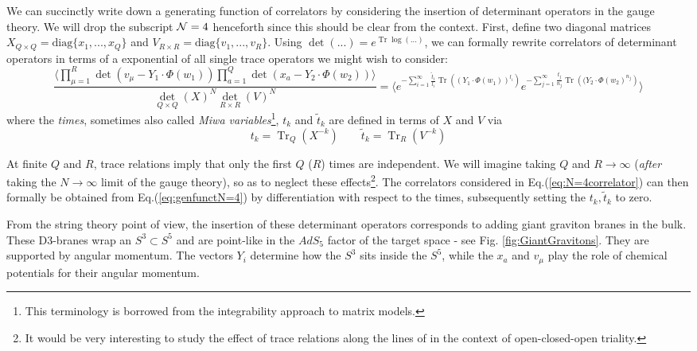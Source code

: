 \documentclass[english]{article}
\DeclareMathOperator{\Tr}{Tr}
\renewcommand{\>}{\rangle}
\newcommand{\<}{\langle}
\renewcommand{\(}{\left(}
\renewcommand{\)}{\right)}
\begin{document}
We can succinctly write down a generating function of correlators by considering the insertion of determinant operators in the gauge theory. We will drop the subscript ${\cal N}=4$ henceforth since this should be clear from the context. First, define two diagonal matrices $X_{Q \times Q} = \text{diag}\{x_{1},...,x_{Q}\}$ and $V_{R\times R} = \text{diag}\{v_{1},...,v_{R}\}$. Using $\det(...) = e^{\Tr \log(...)}$, we can formally rewrite correlators of determinant operators in terms of a exponential of all single trace operators we might wish to consider:
\begin{equation}
    \frac{ \langle \prod_{\mu=1}^{R} \det \left( v_{\mu}-Y_1 \cdot \Phi(w_{1}) \right) \prod_{a=1}^{Q} \det\left(x_{a}-Y_2 \cdot \Phi(w_{2}) \right) \rangle}{\det_{Q \times Q}(X)^{N} \det_{R \times R}(V)^{N}} =  \langle e^{-\sum_{i=1}^{\infty} \frac{\tilde{t}_{i}}{l_{i}} \Tr \left( (Y_1 \cdot \Phi(w_{1}))^{l_{i}} \right)}  e^{-\sum_{j=1}^{\infty} \frac{{t}_{j}}{n_{j}}\Tr \left( (Y_2 \cdot \Phi(w_{2})^{n_{j}} \right)} \rangle \label{eq:genfunctN=4}
\end{equation}
where the {\it times}, sometimes also called 
{\it Miwa variables}\footnote{This terminology is borrowed from the integrability approach to matrix models.}, $t_{k}$ and $\tilde{t}_{k}$ are defined in terms of $X$ and $V$ via 
\begin{equation} \label{eq:tMiwa}
    t_{k}= \Tr_{Q}(X^{-k}) \qquad  \tilde{t}_{k}= \Tr_{R}(V^{-k})
\end{equation} 

At finite $Q$ and $R$, trace relations imply that only the first $Q$ ($R$) times are independent. We will imagine taking $Q$ and $R\rightarrow \infty $ (\textit{after} taking the $N \rightarrow \infty$ limit of the gauge theory), so as to neglect these effects\footnote{It would be very interesting to study the effect of trace relations along the lines of \cite{JiHoon} in the context of open-closed-open triality.}. The correlators considered in Eq.(\ref{eq:N=4correlator}) can then formally be obtained from Eq.(\ref{eq:genfunctN=4}) by differentiation with respect to the times, subsequently setting the $t_{k}, \tilde{t}_{k}$ to zero. 

From the string theory point of view, the insertion of these determinant operators corresponds to adding giant graviton branes in the bulk. These D3-branes wrap an $S^{3} \subset S^{5}$ and are point-like in the $AdS_5$ factor of the target space - see Fig. \ref{fig:GiantGravitons}. They are supported by angular momentum. The vectors $Y_{i}$ determine how the $S^{3}$ sits inside the $S^{5}$, while the $x_{a}$ and $v_{\mu}$ play the role of chemical potentials for their angular momentum.
\end{document}
